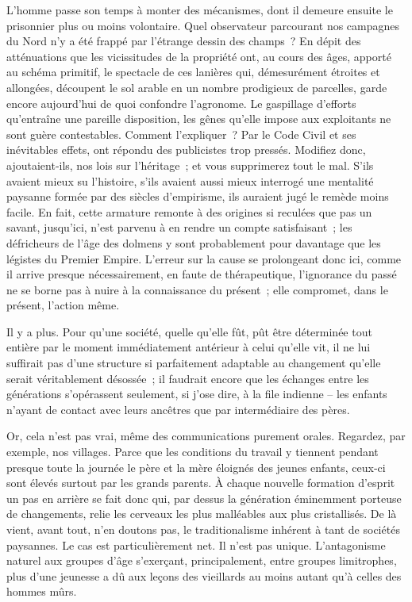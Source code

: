 \documentclass[french,twoside]{book} %
\begin{document}
\noindent L’homme passe son temps à monter des mécanismes, dont il demeure ensuite le prisonnier plus ou moins volontaire. Quel observateur parcou­rant nos campagnes du Nord n’y a été frappé par l’étrange dessin des champs ? En dépit des atténuations que les vicissitudes de la propriété ont, au cours des âges, apporté au schéma primitif, le spectacle de ces lanières qui, démesurément étroites et allongées, découpent le sol arable en un nombre prodigieux de parcelles, garde encore aujourd’hui de quoi confondre l’agronome. Le gaspillage d’efforts qu’entraîne une pareille disposition, les gênes qu’elle impose aux exploitants ne sont guère contes­tables. Comment l’expliquer ? Par le Code Civil et ses inévitables effets, ont répondu des publicistes trop pressés. Modifiez donc, ajoutaient‑ils, nos lois sur l’héritage ; et vous supprimerez tout le mal. S’ils avaient mieux su l’histoire, s’ils avaient aussi mieux interrogé une mentalité paysanne formée par des siècles d’empirisme, ils auraient jugé le remède moins facile. En fait, cette armature remonte à des origines si reculées que pas un savant, jusqu’ici, n’est parvenu à en rendre un compte satis­faisant ; les défricheurs de l’âge des dolmens y sont probablement pour davantage que les légistes du Premier Empire. L’erreur sur la cause se prolongeant donc ici, comme il arrive presque nécessairement, en faute de thérapeutique, l’ignorance du passé ne se borne pas à nuire à la connaissance du présent ; elle compromet, dans le présent, l’action même.\par
\label{p12} Il y a plus. Pour qu’une société, quelle qu’elle fût, pût être déterminée tout entière par le moment immédiatement antérieur à celui qu’elle vit, il ne lui suffirait pas d’une structure si parfaitement adaptable au chan­gement qu’elle serait véritablement désossée ; il faudrait encore que les échanges entre les générations s’opérassent seulement, si j’ose dire, à la file indienne – les enfants n’ayant de contact avec leurs ancêtres que par intermédiaire des pères.\par
Or, cela n’est pas vrai, même des communications purement orales. Regardez, par exemple, nos villages. Parce que les conditions du travail y tiennent pendant presque toute la journée le père et la mère éloignés des jeunes enfants, ceux‑ci sont élevés surtout par les grands parents. À chaque nouvelle formation d’esprit un pas en arrière se fait donc qui, par dessus la génération éminemment porteuse de changements, relie les cerveaux les plus malléables aux plus cristallisés. De là vient, avant tout, n’en doutons pas, le traditionalisme inhérent à tant de sociétés paysannes. Le cas est particulièrement net. Il n’est pas unique. L’anta­gonisme naturel aux groupes d’âge s’exerçant, principalement, entre groupes limitrophes, plus d’une jeunesse a dû aux leçons des vieillards au moins autant qu’à celles des hommes mûrs.\par
\end{document}
